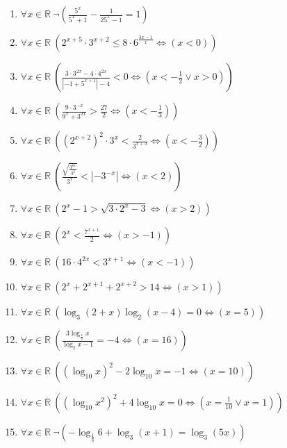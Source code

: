 \documentclass[11pt,a4paper]{article}
\begin{document}
\begin{enumerate}
\item $\displaystyle \forall x \in \mathbb{R}\ \lnot \left( \frac{5^{x}}{5^{x} + 1} - \frac{1}{25^{x} - 1} = 1 \right)$
\item $\displaystyle \forall x \in \mathbb{R}\ \left( 2^{x+5} \cdot 3^{x+2} \le 8 \cdot 6^{\frac{3x-1}{x}} \iff \left( x < 0 \right) \right)$
\item $\displaystyle \forall x \in \mathbb{R}\ \left( \frac{3 \cdot 3^{2x} - 4 \cdot 4^{2x}}{\left| -1 + 5^{x+1} \right| - 4} < 0 \iff \left( x < -\frac{1}{2} \lor x > 0 \right) \right)$
\item $\displaystyle \forall x \in \mathbb{R}\ \left( \frac{9 \cdot 3^{-x}}{9^{x} + 3^{2x}} > \frac{27}{2} \iff \left( x < -\frac{1}{3} \right) \right)$
\item $\displaystyle \forall x \in \mathbb{R}\ \left( (2^{x+2})^{2} \cdot 3^{x} < \frac{2}{3^{x+3}} \iff \left( x < -\frac{3}{2} \right) \right)$
\item $\displaystyle \forall x \in \mathbb{R}\ \left( \frac{\sqrt{\frac{3^{6x}}{3^{2}}}}{3^{7}} < \left| -3^{-x} \right| \iff \left( x < 2 \right) \right)$
\item $\displaystyle \forall x \in \mathbb{R}\ \left( 2^{x} - 1 > \sqrt{3 \cdot 2^{x} - 3} \iff \left( x > 2 \right) \right)$
\item $\displaystyle \forall x \in \mathbb{R}\ \left( 2^{x} < \frac{7^{x+1}}{2} \iff \left( x > -1 \right) \right)$
\item $\displaystyle \forall x \in \mathbb{R}\ \left( 16 \cdot 4^{2x} < 3^{x+1} \iff \left( x < -1 \right) \right)$
\item $\displaystyle \forall x \in \mathbb{R}\ \left( 2^{x} + 2^{x+1} + 2^{x+2} > 14 \iff \left( x > 1 \right) \right)$
\item $\displaystyle \forall x \in \mathbb{R}\ \left( \log_{3}(2 + x)\log_{2}(x - 4) = 0 \iff \left( x = 5 \right) \right)$
\item $\displaystyle \forall x \in \mathbb{R}\ \left( \frac{3\log_{\frac{1}{2}} x}{\log_{2} x - 1} = -4 \iff \left( x = 16 \right) \right)$
\item $\displaystyle \forall x \in \mathbb{R}\ \left( \left(\log_{10} x\right)^{2} - 2\log_{10} x = -1 \iff \left( x = 10 \right) \right)$
\item $\displaystyle \forall x \in \mathbb{R}\ \left( \left(\log_{10} x^{2}\right)^{2} + 4\log_{10} x = 0 \iff \left( x = \frac{1}{10} \lor x = 1 \right) \right)$
\item $\displaystyle \forall x \in \mathbb{R}\ \lnot \left( -\log_{\frac{1}{3}} 6 + \log_{3}(x + 1) = \log_{3}(5x) \right)$

\end{enumerate}
\end{document}
